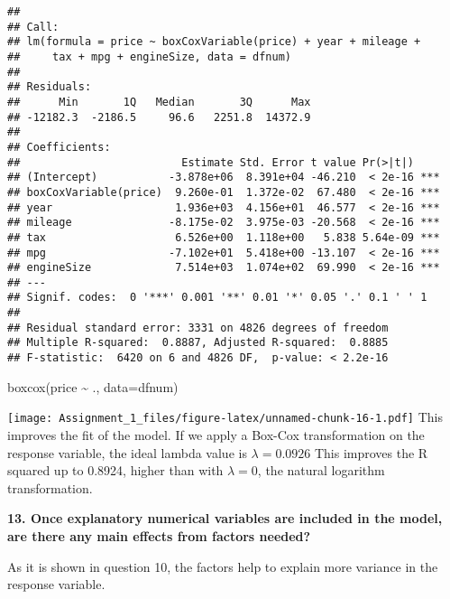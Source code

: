\documentclass[
]{article}
\newenvironment{Shaded}{\begin{snugshade}}{\end{snugshade}}
\newcommand{\AttributeTok}[1]{\textcolor[rgb]{0.77,0.63,0.00}{#1}}
\newcommand{\FunctionTok}[1]{\textcolor[rgb]{0.00,0.00,0.00}{#1}}
\newcommand{\NormalTok}[1]{#1}
\newcommand{\SpecialCharTok}[1]{\textcolor[rgb]{0.00,0.00,0.00}{#1}}
\begin{document}
\begin{verbatim}
## 
## Call:
## lm(formula = price ~ boxCoxVariable(price) + year + mileage + 
##     tax + mpg + engineSize, data = dfnum)
## 
## Residuals:
##      Min       1Q   Median       3Q      Max 
## -12182.3  -2186.5     96.6   2251.8  14372.9 
## 
## Coefficients:
##                         Estimate Std. Error t value Pr(>|t|)    
## (Intercept)           -3.878e+06  8.391e+04 -46.210  < 2e-16 ***
## boxCoxVariable(price)  9.260e-01  1.372e-02  67.480  < 2e-16 ***
## year                   1.936e+03  4.156e+01  46.577  < 2e-16 ***
## mileage               -8.175e-02  3.975e-03 -20.568  < 2e-16 ***
## tax                    6.526e+00  1.118e+00   5.838 5.64e-09 ***
## mpg                   -7.102e+01  5.418e+00 -13.107  < 2e-16 ***
## engineSize             7.514e+03  1.074e+02  69.990  < 2e-16 ***
## ---
## Signif. codes:  0 '***' 0.001 '**' 0.01 '*' 0.05 '.' 0.1 ' ' 1
## 
## Residual standard error: 3331 on 4826 degrees of freedom
## Multiple R-squared:  0.8887, Adjusted R-squared:  0.8885 
## F-statistic:  6420 on 6 and 4826 DF,  p-value: < 2.2e-16
\end{verbatim}

\begin{Shaded}
\begin{Highlighting}[]
\FunctionTok{boxcox}\NormalTok{(price }\SpecialCharTok{\textasciitilde{}}\NormalTok{ ., }\AttributeTok{data=}\NormalTok{dfnum)}
\end{Highlighting}
\end{Shaded}

\texttt{[image: Assignment\_1\_files/figure-latex/unnamed-chunk-16-1.pdf]}
This improves the fit of the model. If we apply a Box-Cox transformation
on the response variable, the ideal lambda value is \(\lambda = 0.0926\)
This improves the R squared up to 0.8924, higher than with
\(\lambda = 0\), the natural logarithm transformation.

\newpage

\textbf{13. Once explanatory numerical variables are included in the model, are there any main effects from
factors needed?}

As it is shown in question 10, the factors help to explain more variance
in the response variable.
\end{document}
